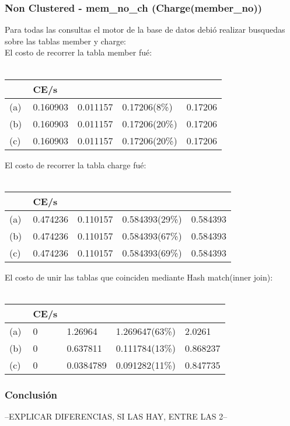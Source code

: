 	
	

\subsubsection{Non Clustered - mem\_no\_ch (Charge(member\_no))}
Para todas las consultas el motor de la base de datos debió realizar busquedas sobre las tablas member y charge: \\  

El costo de recorrer la tabla member fué: \\ \\

\begin{tabular}{| L | L | L | L | L |}
    \hline
     & CE/s &  &  &  \\ \hline
    (a) & 0.160903 & 0.011157 & 0.17206(8\%) & 0.17206 \\ \hline %
    (b) & 0.160903 & 0.011157 & 0.17206(20\%) & 0.17206 \\ \hline
    (c) & 0.160903 & 0.011157 & 0.17206(20\%) & 0.17206 \\ \hline
\end{tabular}

El costo de recorrer la tabla charge fué: \\ \\

\begin{tabular}{| L | L | L | L | L |}
    \hline
     & CE/s &  &  &  \\ \hline
    (a) & 0.474236 & 0.110157 & 0.584393(29\%) & 0.584393 \\ \hline
    (b) & 0.474236 & 0.110157 & 0.584393(67\%) & 0.584393 \\ \hline
    (c) & 0.474236 & 0.110157 & 0.584393(69\%) & 0.584393 \\ \hline
\end{tabular}

El costo de unir las tablas que coinciden mediante Hash match(inner join): \\ \\

\begin{tabular}{| L | L | L | L | L |}
    \hline
     & CE/s &  &  &  \\ \hline
    (a) & 0 & 1.26964 & 1.269647(63\%) & 2.0261 \\ \hline
    (b) & 0 & 0.637811 & 0.111784(13\%) & 0.868237 \\ \hline
    (c) & 0 & 0.0384789 & 0.091282(11\%) & 0.847735 \\ \hline
\end{tabular}
			
			
			


\subsubsection{Conclusión}

--EXPLICAR DIFERENCIAS, SI LAS HAY, ENTRE LAS 2--
